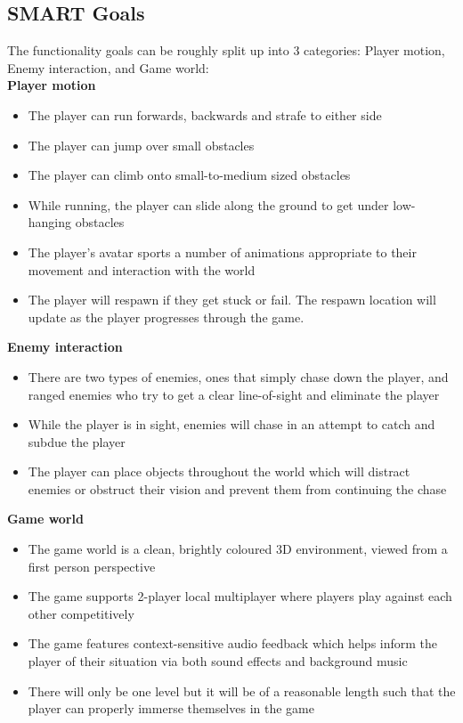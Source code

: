 \documentclass[a4paper,10pt]{article}
\begin{document}
\subsection{SMART Goals} \label{goals}
The functionality goals can be roughly split up into 3 categories: Player motion, Enemy interaction, and Game world:\\
\textbf{Player motion}
\begin{itemize}
	\item The player can run forwards, backwards and strafe to either side
	\item The player can jump over small obstacles
	\item The player can climb onto small-to-medium sized obstacles
	\item While running, the player can slide along the ground to get under low-hanging obstacles
	\item The player's avatar sports a number of animations appropriate to their movement and interaction with the world
	\item The player will respawn if they get stuck or fail. The respawn location will update as the player progresses through the game.
\end{itemize}
\textbf{Enemy interaction}
\begin{itemize}
	\item There are two types of enemies, ones that simply chase down the player, and ranged enemies who try to get a clear line-of-sight and eliminate the player
	\item While the player is in sight, enemies will chase in an attempt to catch and subdue the player
	\item The player can place objects throughout the world which will distract enemies or obstruct their vision and prevent them from continuing the chase
\end{itemize}
\textbf{Game world}
\begin{itemize}
	\item The game world is a clean, brightly coloured 3D environment, viewed from a first person perspective
	\item The game supports 2-player local multiplayer where players play against each other competitively
	\item The game features context-sensitive audio feedback which helps inform the player of their situation via both sound effects and background music
	\item There will only be one level but it will be of a reasonable length such that the player can properly immerse themselves in the game
\end{itemize}
\end{document}
